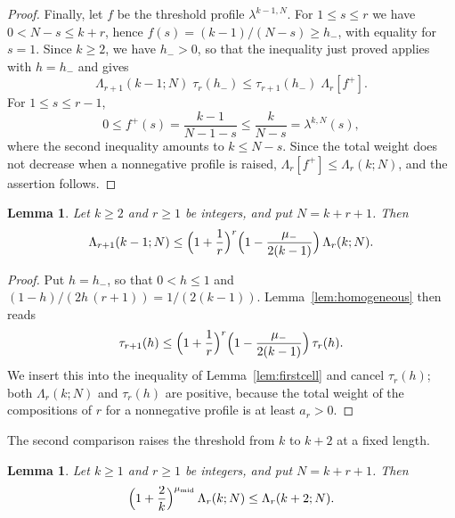 \documentclass{amsart}
\newtheorem{lemma}[theorem]{Lemma}
\theoremstyle{definition}
\theoremstyle{remark}
\numberwithin{equation}{section}
\begin{document}
\begin{proof}
Finally, let $f$ be the threshold profile $\lambda^{k-1,N}$. For $1\le s\le r$ we have $0<N-s\le k+r$, hence $f(s)=(k-1)/(N-s)\ge h_-$, with equality for $s=1$. Since $k\ge 2$, we have $h_->0$, so that the inequality just proved applies with $h=h_-$ and gives
\[
\Lambda_{r+1}(k-1;N)\;\tau_r(h_-)\le\tau_{r+1}(h_-)\;\Lambda_r[f^{+}].
\]
For $1\le s\le r-1$,
\[
0\le f^{+}(s)=\frac{k-1}{N-1-s}\le\frac{k}{N-s}=\lambda^{k,N}(s),
\]
where the second inequality amounts to $k\le N-s$. Since the total weight does not decrease when a nonnegative profile is raised, $\Lambda_r[f^{+}]\le\Lambda_r(k;N)$, and the assertion follows.
\end{proof}

\begin{lemma}\label{lem:shorten}
Let $k\ge 2$ and $r\ge 1$ be integers, and put $N=k+r+1$. Then
\[
\Lambda_{r+1}(k-1;N)\le\Bigl(1+\frac1r\Bigr)^{r}\Bigl(1-\frac{\mu_-}{2(k-1)}\Bigr)\,\Lambda_r(k;N).
\]
\end{lemma}

\begin{proof}
Put $h=h_-$, so that $0<h\le 1$ and $(1-h)/(2h\,(r+1))=1/(2(k-1))$. Lemma~\ref{lem:homogeneous} then reads
\[
\tau_{r+1}(h)\le\Bigl(1+\frac1r\Bigr)^{r}\Bigl(1-\frac{\mu_-}{2(k-1)}\Bigr)\,\tau_r(h).
\]
We insert this into the inequality of Lemma~\ref{lem:firstcell} and cancel $\tau_r(h)$; both $\Lambda_r(k;N)$ and $\tau_r(h)$ are positive, because the total weight of the compositions of $r$ for a nonnegative profile is at least $a_r>0$.
\end{proof}

The second comparison raises the threshold from $k$ to $k+2$ at a fixed length.

\begin{lemma}\label{lem:raise}
Let $k\ge 1$ and $r\ge 1$ be integers, and put $N=k+r+1$. Then
\[
\Bigl(1+\frac2k\Bigr)^{\mu_{\mathrm{mid}}}\,\Lambda_r(k;N)\le\Lambda_r(k+2;N).
\]
\end{lemma}
\end{document}

